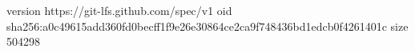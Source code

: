 version https://git-lfs.github.com/spec/v1
oid sha256:a0c49615add360fd0becff1f9e26e30864ce2ca9f748436bd1edcb0f4261401c
size 504298
